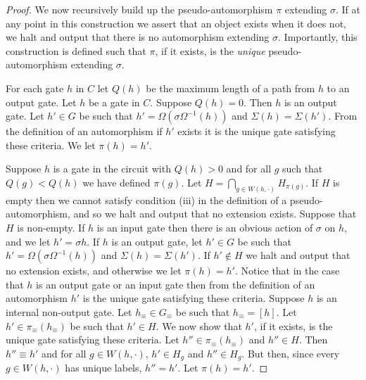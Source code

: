 \documentclass[../main/thesis.tex]{subfiles}
\begin{document}
\begin{proof}
We now recursively build up the pseudo-automorphism $\pi$ extending $\sigma$. If
at any point in this construction we assert that an object exists when it does
not, we halt and output that there is no automorphism extending $\sigma$.
Importantly, this construction is defined such that $\pi$, if it exists, is the
\emph{unique} pseudo-automorphism extending $\sigma$.

For each gate $h$ in $C$ let $Q(h)$ be the maximum length of a path from $h$ to
an output gate. Let $h$ be a gate in $C$. Suppose $Q(h) = 0$. Then $h$ is an
output gate. Let $h' \in G$ be such that $h' = \Omega (\sigma \Omega^{-1}(h))$
and $\Sigma (h) = \Sigma (h')$. From the definition of an automorphism if $h'$
exists it is the unique gate satisfying these criteria. We let $\pi (h) = h'$.

Suppose $h$ is a gate in the circuit with $Q(h) > 0$ and for all $g$ such that
$Q(g ) < Q(h)$ we have defined $\pi (g)$. Let $H = \bigcap_{g \in W(h, \cdot)}
H_{\pi(g)}$. If $H$ is empty then we cannot satisfy condition (iii) in the
definition of a pseudo-automorphism, and so we halt and output that no extension
exists. Suppose that $H$ is non-empty. If $h$ is an input gate then there is an
obvious action of $\sigma$ on $h$, and we let $h' = \sigma h$. If $h$ is an
output gate, let $h' \in G$ be such that $h' = \Omega (\sigma \Omega^{-1} (h))$
and $\Sigma (h) = \Sigma (h')$. If $h' \not\in H$ we halt and output that no
extension exists, and otherwise we let $\pi (h) = h'$. Notice that in the case
that $h$ is an output gate or an input gate then from the definition of an
automorphism $h'$ is the unique gate satisfying these criteria. Suppose $h$ is
an internal non-output gate. Let $h_\equiv \in G_\equiv$ be such that $h_\equiv
= [h]$. Let $h' \in \pi_\equiv (h_\equiv)$ be such that $h' \in H$. We now show
that $h'$, if it exists, is the unique gate satisfying these criteria. Let $h''
\in \pi_\equiv (h_\equiv)$ and $h'' \in H$. Then $h'' \equiv h'$ and for all $g
\in W(h, \cdot)$, $h' \in H_g$ and $h'' \in H_g$. But then, since every $g \in
W(h, \cdot)$ has unique labels, $h'' = h'$. Let $\pi (h) = h'$.


\end{proof}
\end{document}
